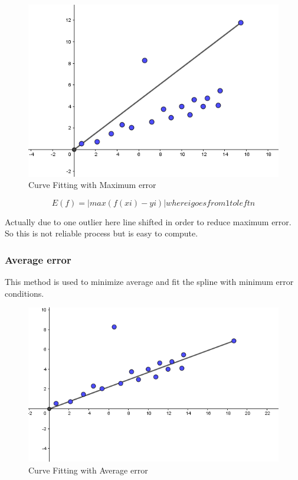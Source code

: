 \begin{figure}[!htb]
\includegraphics[width=\textwidth]{./figures/Maxerror.PNG}
\caption{Curve Fitting with Maximum error }
\end{figure}

\begin{equation}
E(f)=|max (f(xi)-yi)|  where i goes from 1 to left n
\end{equation}

Actually due to one outlier here line shifted in order to reduce maximum error. So this is not reliable process but is easy to compute.

\subsubsection{Average error}
This method is used to minimize average and fit the spline with minimum error conditions.

\begin{figure}[!htb]
\includegraphics[width=\textwidth]{./figures/average.PNG}
\caption{Curve Fitting with Average error }
\end{figure}

